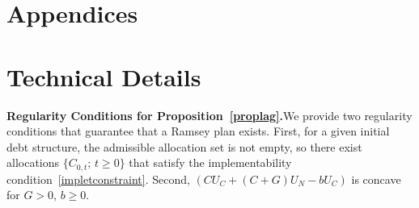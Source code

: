 \documentclass[12pt]{article}
\begin{document}
\bigskip






\clearpage




\pagebreak
\section*{Appendices}
\appendix{}
\setcounter{equation}{0}
\renewcommand{\theequation}{A-\arabic{equation}}
\setcounter{section}{0}
\renewcommand{\thesection}{\Alph{section}}
\renewcommand{\thesubsection}{\Alph{section}.\arabic{subsection}}
\setcounter{figure}{0}
\renewcommand{\thefigure}{A-\arabic{figure}}
\setcounter{footnote}{0}
\renewcommand{\thefootnote}{A-\arabic{footnote}}
\bigskip%


\section{Technical Details} \label{appendix:A}

\medskip
\noindent\textbf{Regularity Conditions for Proposition~\ref{proplag}.}\quad We provide two regularity conditions that guarantee that a Ramsey plan exists. First, for a given initial debt structure, the admissible allocation set is not empty, so there exist allocations $\{C_{0,t};\, t \ge 0\}$ that satisfy the implementability condition~\eqref{impletconstraint}. Second, $(CU_C + (C+G)U_N - bU_C)$ is concave for $G > 0$, $b \ge 0$.


\bigskip
\end{document}
